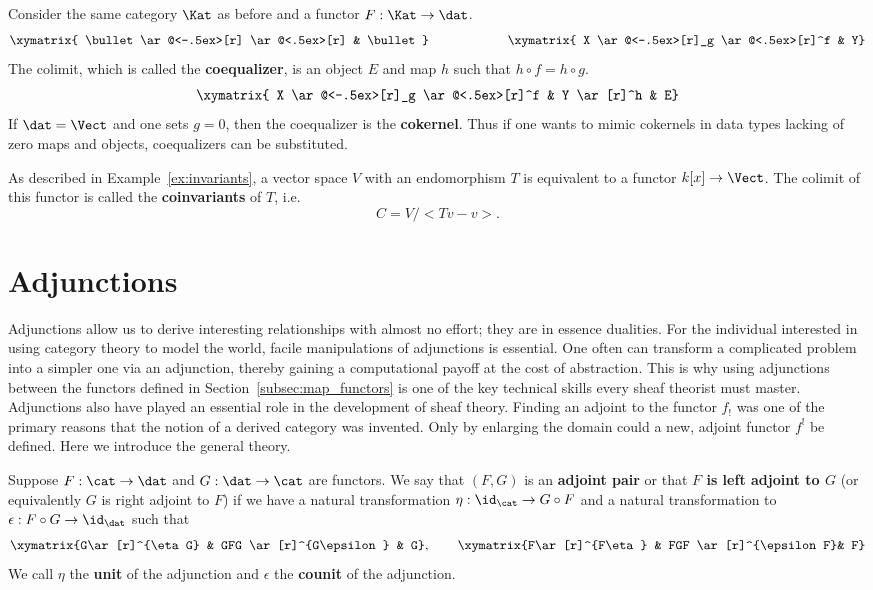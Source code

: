 \begin{ex}\label{ex:coequalizer}
	Consider the same category $\Kat$ as before and a functor $F:\Kat\to\dat$.
	\[
	 \xymatrix{ \bullet \ar@<-.5ex>[r] \ar@<.5ex>[r] & \bullet}
	\qquad \qquad \qquad
	 \xymatrix{ X \ar@<-.5ex>[r]_g \ar@<.5ex>[r]^f & Y}
	\]
	The colimit, which is called the \textbf{coequalizer}, is an object $E$ and map $h$ such that $h \circ f=h\circ g$.
	\[
	 \xymatrix{ X \ar@<-.5ex>[r]_g \ar@<.5ex>[r]^f & Y \ar[r]^h & E}
	\]
	If $\dat=\Vect$ and one sets $g=0$, then the coequalizer is the \textbf{cokernel}. Thus if one wants to mimic cokernels in data types lacking of zero maps and objects, coequalizers can be substituted.
\end{ex}

\begin{ex}[Co-invariants]
	As described in Example~\ref{ex:invariants}, a vector space $V$ with an endomorphism $T$ is equivalent to a functor $k[x]\to\Vect$. The colimit of this functor is called the \textbf{coinvariants} of $T$, i.e.
	\[
		C=V/<Tv-v>.
	\]
\end{ex}

\section{Adjunctions}
\label{sec:adjunctions}

Adjunctions allow us to derive interesting relationships with almost no effort; they are in essence dualities. For the individual interested in using category theory to model the world, facile manipulations of adjunctions is essential. One often can transform a complicated problem into a simpler one via an adjunction, thereby gaining a computational payoff at the cost of abstraction. This is why using adjunctions between the functors defined in Section~\ref{subsec:map_functors} is one of the key technical skills every sheaf theorist must master. Adjunctions also have played an essential role in the development of sheaf theory. Finding an adjoint to the functor $f_!$ was one of the primary reasons that the notion of a derived category was invented. Only by enlarging the domain could a new, adjoint functor $f^!$ be defined. Here we introduce the general theory.

\begin{defn}
 Suppose $F:\cat\to\dat$ and $G:\dat\to\cat$ are functors. We say that $(F,G)$ is an \textbf{adjoint pair} or that \textbf{$F$ is left adjoint to $G$} (or equivalently $G$ is right adjoint to $F$) if we have a natural transformation $\eta:\id_{\cat}\to G\circ F$ and a natural transformation to $\epsilon:F\circ G\to \id_{\dat}$ such that
\[
	\xymatrix{G\ar[r]^{\eta G} & GFG \ar[r]^{G\epsilon} & G},\qquad \xymatrix{F\ar[r]^{F\eta} & FGF \ar[r]^{\epsilon F}& F}
\]
We call $\eta$ the \textbf{unit} of the adjunction and $\epsilon$ the \textbf{counit} of the adjunction.
\end{defn}


